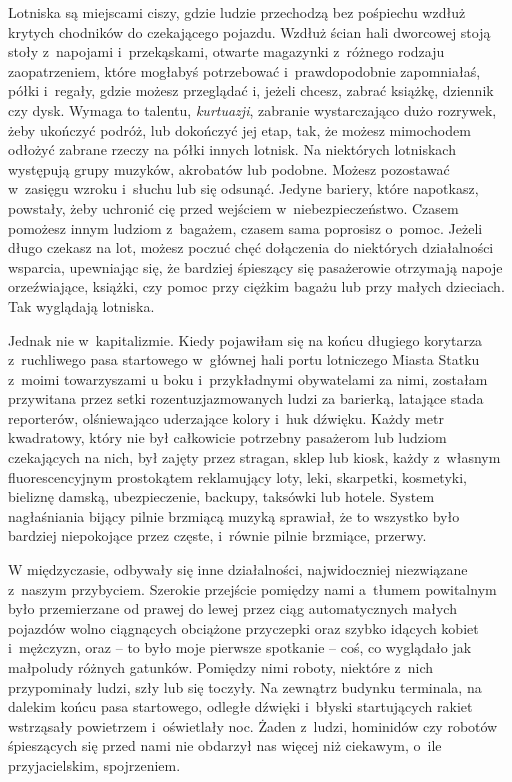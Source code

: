 \documentclass[oneside,polish,11pt,sfheadings]{mwbk}
\begin{document}
Lotniska są miejscami ciszy, gdzie ludzie przechodzą bez pośpiechu
wzdłuż krytych chodników do czekającego pojazdu. Wzdłuż ścian hali
dworcowej stoją stoły z~napojami i~przekąskami, otwarte magazynki z~różnego rodzaju zaopatrzeniem, które mogłabyś potrzebować i~prawdopodobnie zapomniałaś, półki i~regały, gdzie możesz przeglądać i,
jeżeli chcesz, zabrać książkę, dziennik czy dysk. Wymaga to talentu,
\textit{kurtuazji}, zabranie wystarczająco dużo rozrywek, żeby ukończyć
podróż, lub dokończyć jej etap, tak, że możesz mimochodem odłożyć
zabrane rzeczy na półki innych lotnisk. Na niektórych lotniskach
występują grupy muzyków, akrobatów lub podobne. Możesz pozostawać w~zasięgu wzroku i~słuchu lub się odsunąć. Jedyne bariery, które
napotkasz, powstały, żeby uchronić cię przed wejściem w~niebezpieczeństwo. Czasem pomożesz innym ludziom z~bagażem, czasem sama
poprosisz o~pomoc. Jeżeli długo czekasz na lot, możesz poczuć chęć
dołączenia do niektórych działalności wsparcia, upewniając się, że
bardziej śpieszący się pasażerowie otrzymają napoje orzeźwiające,
książki, czy pomoc przy ciężkim bagażu lub przy małych dzieciach. Tak
wyglądają lotniska.

Jednak nie w~kapitalizmie. Kiedy pojawiłam się na końcu długiego
korytarza z~ruchliwego pasa startowego w~głównej hali portu lotniczego
Miasta Statku z~moimi towarzyszami u boku i~przykładnymi obywatelami za
nimi, zostałam przywitana przez setki rozentuzjazmowanych ludzi za
barierką, latające stada reporterów, olśniewająco uderzające kolory i~huk dźwięku. Każdy metr kwadratowy, który nie był całkowicie potrzebny
pasażerom lub ludziom czekających na nich, był zajęty przez stragan,
sklep lub kiosk, każdy z~własnym fluorescencyjnym prostokątem
reklamujący loty, leki, skarpetki, kosmetyki, bieliznę damską,
ubezpieczenie, backupy, taksówki lub hotele. System nagłaśniania bijący
pilnie brzmiącą muzyką sprawiał, że to wszystko było bardziej
niepokojące przez częste, i~równie pilnie brzmiące, przerwy.

W międzyczasie, odbywały się inne działalności, najwidoczniej
niezwiązane z~naszym przybyciem. Szerokie przejście pomiędzy nami a~tłumem powitalnym było przemierzane od prawej do lewej przez ciąg
automatycznych małych pojazdów wolno ciągnących obciążone przyczepki
oraz szybko idących kobiet i~mężczyzn, oraz -- to było moje pierwsze
spotkanie -- coś, co wyglądało jak małpoludy różnych gatunków. Pomiędzy
nimi roboty, niektóre z~nich przypominały ludzi, szły lub się toczyły.
Na zewnątrz budynku terminala, na dalekim końcu pasa startowego, odległe
dźwięki i~błyski startujących rakiet wstrząsały powietrzem i~oświetlały
noc. Żaden z~ludzi, hominidów czy robotów śpieszących się przed nami nie
obdarzył nas więcej niż ciekawym, o~ile przyjacielskim, spojrzeniem.
\end{document}

